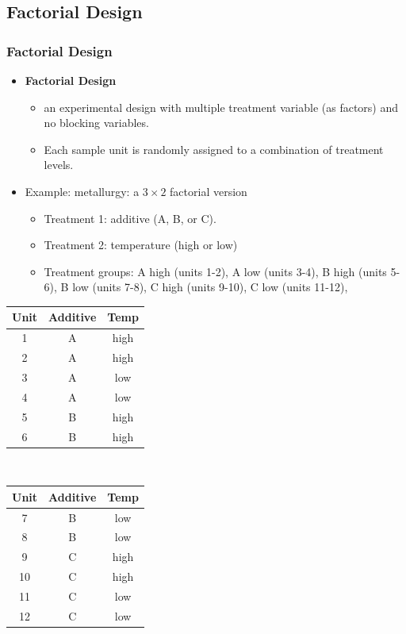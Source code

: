 \documentclass[handout]{beamer}\usepackage{graphicx, color}
\numberwithin{equation}{section}
\begin{document}
\subsection{Factorial Design}


\begin{frame}
\frametitle{Factorial Design} \small

\begin{itemize}
\item {\bf Factorial Design} 
\begin{itemize}
\pause \item an experimental design with multiple treatment variable (as factors) and no blocking variables.
\pause \item Each sample unit is randomly assigned to a combination of treatment levels.
\end{itemize} 
\pause \item Example: metallurgy: a $3 \times 2$ factorial version
\begin{itemize}
\pause \item Treatment 1: additive (A, B, or C).
\pause \item Treatment 2: temperature (high or low)
\pause \item Treatment groups: A high (units 1-2), A low (units 3-4), B high (units 5-6), B low (units 7-8), C high (units 9-10), C low (units 11-12), 
\end{itemize} 
\end{itemize}
\scriptsize
\begin{center}
\begin{tabular}{c|c|c}
Unit & Additive & Temp \\ \hline
1 & A & high \\ 
2 & A & high \\ 
3 & A & low \\ 
4 & A & low \\ 
5 & B & high \\ 
6 & B & high\\ 
\end{tabular}$\quad$ \begin{tabular}{c|c|c}
Unit & Additive & Temp \\ \hline
7 & B & low \\ 
8 & B & low \\ 
9 & C & high \\ 
10 & C & high \\ 
11 & C & low \\ 
12 & C & low \\ 
\end{tabular}
\end{center}
\end{frame}
\end{document}
